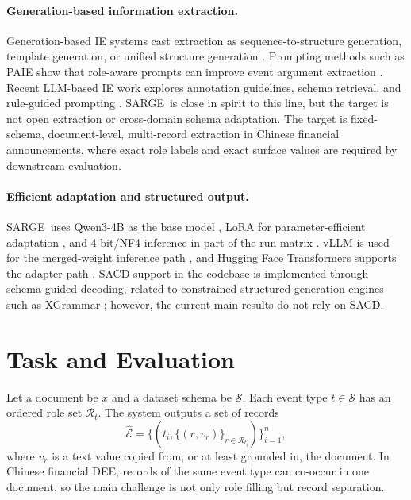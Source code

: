 \documentclass[11pt]{article}
\newcommand{\method}{SARGE}
\begin{document}
\paragraph{Generation-based information extraction.}
Generation-based IE systems cast extraction as sequence-to-structure generation, template generation, or unified structure generation \citep{lu2021text2event,lu2022uie,hsu2022degree}. Prompting methods such as PAIE show that role-aware prompts can improve event argument extraction \citep{ma2022paie}. Recent LLM-based IE work explores annotation guidelines, schema retrieval, and rule-guided prompting \citep{sainz2024gollie,liang2025asee,zuo2025hero}. \method\ is close in spirit to this line, but the target is not open extraction or cross-domain schema adaptation. The target is fixed-schema, document-level, multi-record extraction in Chinese financial announcements, where exact role labels and exact surface values are required by downstream evaluation.

\paragraph{Efficient adaptation and structured output.}
\method\ uses Qwen3-4B as the base model \citep{qwen3technical}, LoRA for parameter-efficient adaptation \citep{hu2022lora}, and 4-bit/NF4 inference in part of the run matrix \citep{dettmers2023qlora}. vLLM is used for the merged-weight inference path \citep{kwon2023vllm}, and Hugging Face Transformers supports the adapter path \citep{wolf2020transformers}. SACD support in the codebase is implemented through schema-guided decoding, related to constrained structured generation engines such as XGrammar \citep{dong2024xgrammar}; however, the current main results do not rely on SACD.

\section{Task and Evaluation}

Let a document be $x$ and a dataset schema be $\mathcal{S}$. Each event type $t \in \mathcal{S}$ has an ordered role set $\mathcal{R}_{t}$. The system outputs a set of records
\[
\hat{\mathcal{E}} = \{(t_i, \{(r, v_r)\}_{r \in \mathcal{R}_{t_i}})\}_{i=1}^{n},
\]
where $v_r$ is a text value copied from, or at least grounded in, the document. In Chinese financial DEE, records of the same event type can co-occur in one document, so the main challenge is not only role filling but record separation.
\end{document}
